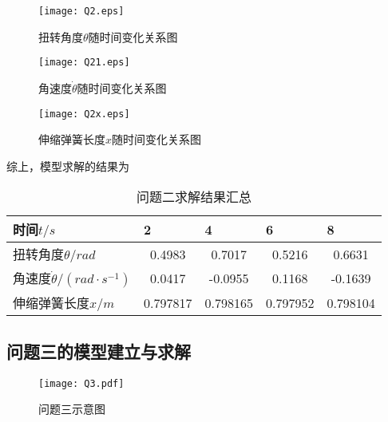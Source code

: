 \documentclass[a4paper,c5size,twoside,UTF8]{ctexart} %
\numberwithin{equation}{section}   %
\begin{document}
\begin{figure}[H]
	\centering
	\texttt{[image: Q2.eps]}
	\caption{扭转角度$\theta$随时间变化关系图}
\end{figure}

\begin{figure}[H]
	\centering
	\texttt{[image: Q21.eps]}
	\caption{角速度$\dot{\theta}$随时间变化关系图}
\end{figure}

\begin{figure}[H]
	\centering
	\texttt{[image: Q2x.eps]}
	\caption{伸缩弹簧长度$x$随时间变化关系图}
\end{figure}


综上，模型求解的结果为

\begin{table}[H]
    \centering
    \caption{问题二求解结果汇总}
    \begin{tabular}{|l|l|l|l|l|}
        \hline
        时间$t/s$                             & 2                           & 4                            & 6                           & 8                            \\ \hline
        扭转角度$\theta/rad$                    & \multicolumn{1}{c|}{0.4983} & \multicolumn{1}{c|}{0.7017}  & \multicolumn{1}{c|}{0.5216} & \multicolumn{1}{c|}{0.6631}  \\ \hline
        角速度$\dot{\theta}/(rad \cdot s^{-1})$ & \multicolumn{1}{c|}{0.0417} & \multicolumn{1}{c|}{-0.0955} & \multicolumn{1}{c|}{0.1168} & \multicolumn{1}{c|}{-0.1639} \\ \hline
        伸缩弹簧长度$x/m$                         & 0.797817                      & 0.798165                       & 0.797952                      & 0.798104                       \\ \hline
    \end{tabular}
\end{table}


\newpage


\subsection{问题三的模型建立与求解}

\begin{figure}[H]
	\centering
	\texttt{[image: Q3.pdf]}
	\caption{问题三示意图}
\end{figure}
\end{document}
